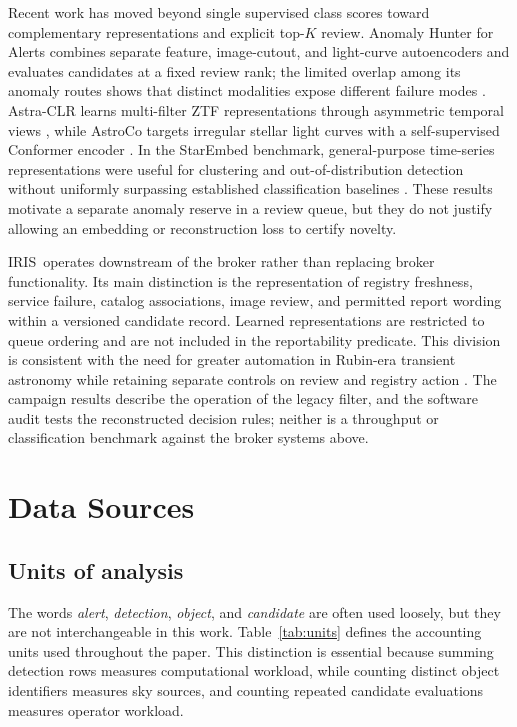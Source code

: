 \documentclass[11pt]{article}
\newcommand{\iris}{IRIS}
\begin{document}
Recent work has moved beyond single supervised class scores toward complementary representations and explicit top-$K$ review. Anomaly Hunter for Alerts combines separate feature, image-cutout, and light-curve autoencoders and evaluates candidates at a fixed review rank; the limited overlap among its anomaly routes shows that distinct modalities expose different failure modes \citep{iskandarli2026}. Astra-CLR learns multi-filter ZTF representations through asymmetric temporal views \citep{majumder2026}, while AstroCo targets irregular stellar light curves with a self-supervised Conformer encoder \citep{tan2025}. In the StarEmbed benchmark, general-purpose time-series representations were useful for clustering and out-of-distribution detection without uniformly surpassing established classification baselines \citep{li2026}. These results motivate a separate anomaly reserve in a review queue, but they do not justify allowing an embedding or reconstruction loss to certify novelty.

\iris\ operates downstream of the broker rather than replacing broker functionality. Its main distinction is the representation of registry freshness, service failure, catalog associations, image review, and permitted report wording within a versioned candidate record. Learned representations are restricted to queue ordering and are not included in the reportability predicate. This division is consistent with the need for greater automation in Rubin-era transient astronomy while retaining separate controls on review and registry action \citep{rehemtulla2025}. The campaign results describe the operation of the legacy filter, and the software audit tests the reconstructed decision rules; neither is a throughput or classification benchmark against the broker systems above.

\section{Data Sources}
\label{sec:data}

\subsection{Units of analysis}

The words \emph{alert}, \emph{detection}, \emph{object}, and \emph{candidate} are often used loosely, but they are not interchangeable in this work. Table~\ref{tab:units} defines the accounting units used throughout the paper. This distinction is essential because summing detection rows measures computational workload, while counting distinct object identifiers measures sky sources, and counting repeated candidate evaluations measures operator workload.
\end{document}
